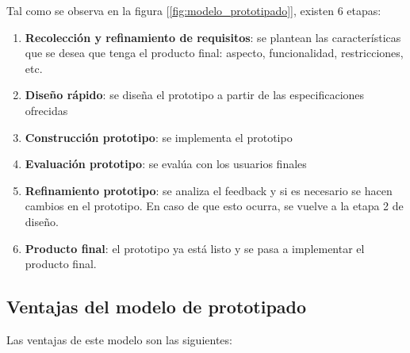 Tal como se observa en la figura [\ref{fig:modelo_prototipado}], existen 6 etapas:

\begin{enumerate}
    \item \textbf{Recolección y refinamiento de requisitos}: se plantean las características que se desea que tenga el producto final: aspecto, funcionalidad, restricciones, etc. 
    \item \textbf{Diseño rápido}: se diseña el prototipo a partir de las especificaciones ofrecidas 
    \item \textbf{Construcción prototipo}: se implementa el prototipo
    \item \textbf{Evaluación prototipo}: se evalúa con los usuarios finales
    \item \textbf{Refinamiento prototipo}: se analiza el feedback y si es necesario se hacen cambios en el prototipo. En caso de que esto ocurra, se vuelve a la etapa 2 de diseño.
    \item \textbf{Producto final}: el prototipo ya está listo y se pasa a implementar el producto final.
\end{enumerate}

\subsection{Ventajas del modelo de prototipado}
Las ventajas de este modelo son las siguientes: 

